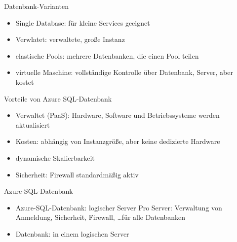 

\begin{flashcard}[Definition]{Datenbank-Varianten}
    \begin{itemize}
        \item Single Database:\newline
            für kleine Services geeignet
        \item Verwlatet:\newline
            verwaltete, große Instanz
        \item elastische Pools:\newline
            mehrere Datenbanken, die einen Pool teilen
        \item virtuelle Maschine:\newline
            vollständige Kontrolle über Datenbank, Server, aber kostet
    \end{itemize}
\end{flashcard}


\begin{flashcard}[Definition]{Vorteile von Azure SQL-Datenbank}
    \begin{itemize}
        \item Verwaltet (PaaS): Hardware, Software und Betriebssysteme werden aktualisiert
        \item Kosten: abhängig von Instanzgröße, aber keine dedizierte Hardware
        \item dynamische Skalierbarkeit
        \item Sicherheit: Firewall standardmäßig aktiv
    \end{itemize}
\end{flashcard}

\begin{flashcard}[Definition]{Azure-SQL-Datenbank}
    \begin{itemize}
        \item Azure-SQL-Datenbank: logischer Server\newline
            Pro Server: Verwaltung von Anmeldung, Sicherheit, Firewall, \ldots für alle Datenbanken
        \item Datenbank: in einem logischen Server
    \end{itemize}
\end{flashcard}

